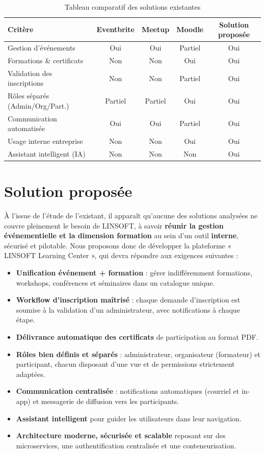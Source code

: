 \documentclass[12pt,a4paper,oneside]{report}
\begin{document}
\begin{table}[H]\centering\renewcommand{\arraystretch}{1.3}
\begin{tabular}{|p{4.2cm}|c|c|c|c|}\hline
\rowcolor{gray!15}\textbf{Critère} & \textbf{Eventbrite} & \textbf{Meetup} & \textbf{Moodle} & \textbf{Solution proposée} \\ \hline
Gestion d'événements       & Oui & Oui & Partiel & Oui \\ \hline
Formations \& certificats  & Non & Non & Oui & Oui \\ \hline
Validation des inscriptions& Non & Non & Partiel & Oui \\ \hline
Rôles séparés (Admin/Org/Part.) & Partiel & Partiel & Oui & Oui \\ \hline
Communication automatisée  & Oui & Oui & Partiel & Oui \\ \hline
Usage interne entreprise   & Non & Non & Oui & Oui \\ \hline
Assistant intelligent (IA) & Non & Non & Non & Oui \\ \hline
\end{tabular}
\caption{Tableau comparatif des solutions existantes}\label{tab:comparatif}
\end{table}

\section{Solution proposée}
À l'issue de l'étude de l'existant, il apparaît qu'aucune des solutions analysées ne couvre
pleinement le besoin de LINSOFT, à savoir \textbf{réunir la gestion événementielle et la
dimension formation} au sein d'un outil \textbf{interne}, sécurisé et pilotable. Nous
proposons donc de développer la plateforme « LINSOFT Learning Center », qui devra répondre aux
exigences suivantes :

\begin{itemize}[leftmargin=1.2cm]
  \item \textbf{Unification événement + formation} : gérer indifféremment formations,
  workshops, conférences et séminaires dans un catalogue unique.
  \item \textbf{Workflow d'inscription maîtrisé} : chaque demande d'inscription est soumise à
  la validation d'un administrateur, avec notifications à chaque étape.
  \item \textbf{Délivrance automatique des certificats} de participation au format PDF.
  \item \textbf{Rôles bien définis et séparés} : administrateur, organisateur (formateur) et
  participant, chacun disposant d'une vue et de permissions strictement adaptées.
  \item \textbf{Communication centralisée} : notifications automatiques (courriel et in-app)
  et messagerie de diffusion vers les participants.
  \item \textbf{Assistant intelligent} pour guider les utilisateurs dans leur navigation.
  \item \textbf{Architecture moderne, sécurisée et scalable} reposant sur des microservices,
  une authentification centralisée et une conteneurisation.
\end{itemize}
\end{document}
